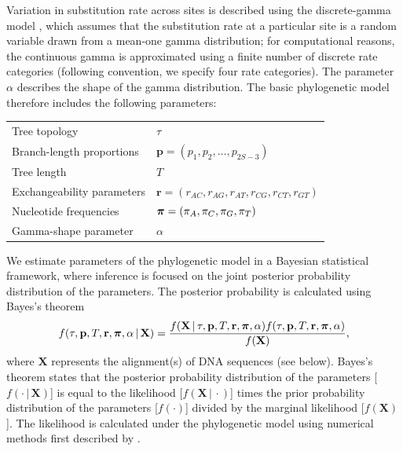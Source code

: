 \documentclass[11pt]{article}
\newcommand{\given}{\ensuremath{\,|\,}}
\begin{document}
Variation in substitution rate across sites is described using the discrete-gamma model \citep{yang93,yang94a}, which assumes that the substitution rate at a particular site is a random variable drawn from a mean-one gamma distribution; for computational reasons, the continuous gamma is approximated using a finite number of discrete rate categories (following convention, we specify four rate categories).
The parameter $\alpha$ describes the shape of the gamma distribution.
The basic phylogenetic model therefore includes the following parameters:
\begin{center}
\begin{tabular}{ll}
Tree topology              & $\tau$ \\
Branch-length proportions  & ${\mathbf p} = (p_1, p_2, \ldots, p_{2S-3})$ \\
Tree length                & $T$ \\
Exchangeability parameters & ${\mathbf r} = (r_{AC}, r_{AG}, r_{AT}, r_{CG}, r_{CT}, r_{GT})$ \\
Nucleotide frequencies     & $\mbox{\boldmath$\pi$\unboldmath} = (\pi_A, \pi_C, \pi_G, \pi_T)$ \\
Gamma-shape parameter      & $\alpha$
\end{tabular}
\end{center}

We estimate parameters of the phylogenetic model in a Bayesian statistical framework, where inference is focused on the joint posterior probability distribution of the parameters.
The posterior probability is calculated using Bayes's theorem
\begin{align}
f(\tau, {\mathbf p}, T, {\mathbf r}, \mbox{\boldmath$\pi$\unboldmath}, \alpha \given {\mathbf X}) = {
f({\mathbf X} \given \tau, {\mathbf p}, T, {\mathbf r}, \mbox{\boldmath$\pi$\unboldmath}, \alpha)
f(\tau, {\mathbf p}, T, {\mathbf r}, \mbox{\boldmath$\pi$\unboldmath}, \alpha)
\over f({\mathbf X})},
\end{align}
where ${\mathbf X}$ represents the alignment(s) of DNA sequences (see below).
Bayes's theorem states that the posterior probability distribution of the parameters [$f(\cdot \given {\mathbf X})$] is equal to the likelihood [$f({\mathbf X} \given \cdot)$]
times the prior probability distribution of the parameters [$f(\cdot)$] divided by the marginal likelihood [$f({\mathbf X})$].
The likelihood is calculated under the phylogenetic model using numerical methods first described by \citet{felsenstein81}.
\end{document}
